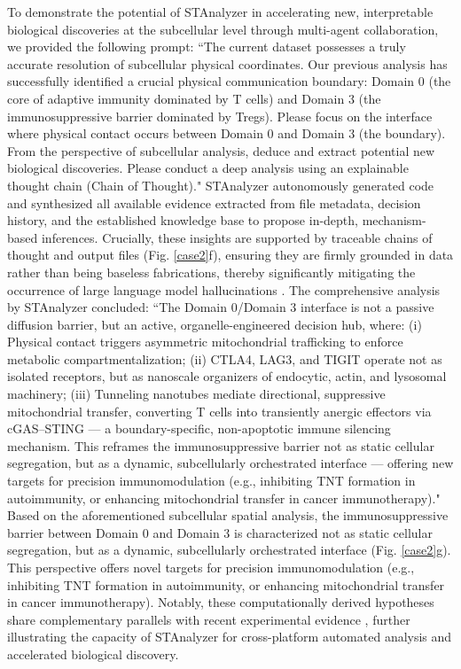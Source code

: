 \documentclass[11pt,a4paper]{article}
\begin{document}
To demonstrate the potential of STAnalyzer in accelerating new, interpretable biological discoveries at the subcellular level through multi-agent collaboration, we provided the following prompt: ``The current dataset possesses a truly accurate resolution of subcellular physical coordinates. Our previous analysis has successfully identified a crucial physical communication boundary: Domain 0 (the core of adaptive immunity dominated by T cells) and Domain 3 (the immunosuppressive barrier dominated by Tregs). Please focus on the interface where physical contact occurs between Domain 0 and Domain 3 (the boundary). From the perspective of subcellular analysis, deduce and extract potential new biological discoveries. Please conduct a deep analysis using an explainable thought chain (Chain of Thought)." STAnalyzer autonomously generated code and synthesized all available evidence extracted from file metadata, decision history, and the established knowledge base to propose in-depth, mechanism-based inferences. Crucially, these insights are supported by traceable chains of thought and output files (Fig. \ref{case2}f), ensuring they are firmly grounded in data rather than being baseless fabrications, thereby significantly mitigating the occurrence of large language model hallucinations \cite{yao2022react}. The comprehensive analysis by STAnalyzer concluded: ``The Domain 0/Domain 3 interface is not a passive diffusion barrier, but an active, organelle-engineered decision hub, where: (i) Physical contact triggers asymmetric mitochondrial trafficking to enforce metabolic compartmentalization; (ii) CTLA4, LAG3, and TIGIT operate not as isolated receptors, but as nanoscale organizers of endocytic, actin, and lysosomal machinery; (iii) Tunneling nanotubes mediate directional, suppressive mitochondrial transfer, converting T cells into transiently anergic effectors via cGAS–STING — a boundary-specific, non-apoptotic immune silencing mechanism. This reframes the immunosuppressive barrier not as static cellular segregation, but as a dynamic, subcellularly orchestrated interface — offering new targets for precision immunomodulation (e.g., inhibiting TNT formation in autoimmunity, or enhancing mitochondrial transfer in cancer immunotherapy)." Based on the aforementioned subcellular spatial analysis, the immunosuppressive barrier between Domain 0 and Domain 3 is characterized not as static cellular segregation, but as a dynamic, subcellularly orchestrated interface (Fig. \ref{case2}g). This perspective offers novel targets for precision immunomodulation (e.g., inhibiting TNT formation in autoimmunity, or enhancing mitochondrial transfer in cancer immunotherapy). Notably, these computationally derived hypotheses share complementary parallels with recent experimental evidence \cite{baldwin2024intercellular,kwon2020cytosolic}, further illustrating the capacity of STAnalyzer for cross-platform automated analysis and accelerated biological discovery.
\end{document}
